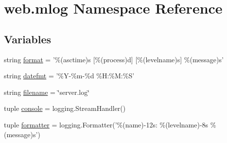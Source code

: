 \hypertarget{namespaceweb_1_1mlog}{\section{web.\-mlog Namespace Reference}
\label{namespaceweb_1_1mlog}
}
\subsection*{Variables}
\begin{DoxyCompactItemize}
\item 
string \hyperlink{namespaceweb_1_1mlog_a00f8125e9f17157323540a7e1a1d87e1}{format} = '\%(asctime)s \mbox{[}\%(process)d\mbox{]} \mbox{[}\%(levelname)s\mbox{]} \%(message)s'
\item 
string \hyperlink{namespaceweb_1_1mlog_a9b58771f85f132788f53c33d98d8cb30}{datefmt} = '\%Y-\/\%m-\/\%d \%H\-:\%M\-:\%S'
\item 
string \hyperlink{namespaceweb_1_1mlog_a538c912597a5d2ac200d6932d02cac96}{filename} = \char`\"{}server.\-log\char`\"{}
\item 
tuple \hyperlink{namespaceweb_1_1mlog_a584640685df4cef6445090f31fb29746}{console} = logging.\-Stream\-Handler()
\item 
tuple \hyperlink{namespaceweb_1_1mlog_a202732635fa47983472657e9eaba3a88}{formatter} = logging.\-Formatter('\%(name)-\/12s\-: \%(levelname)-\/8s \%(message)s')
\end{DoxyCompactItemize}


